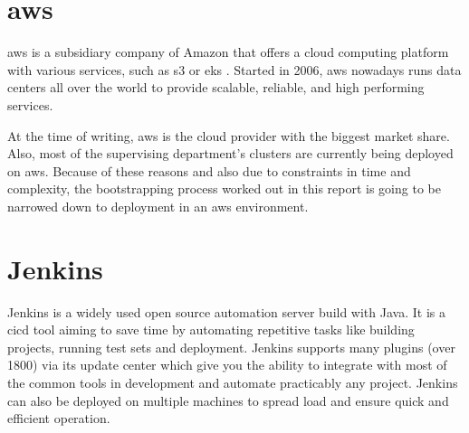 
\section{\ac{aws}}
\ac{aws} is a subsidiary company of Amazon that offers a cloud computing platform with various services, such as \ac{s3} \cite{aws.s3} or \ac{eks} \cite{aws.eks}.
Started in 2006, \ac{aws} nowadays runs data centers all over the world to provide scalable, reliable, and high performing services. \cite{aws.linkedin, whatisaws}

At the time of writing, \ac{aws} is the cloud provider with the biggest market share. \cite{aws.marketshare}
Also, most of the supervising department's clusters are currently being deployed on \ac{aws}.
Because of these reasons and also due to constraints in time and complexity, the bootstrapping process worked out in this report is going to be narrowed down to deployment in an \ac{aws} environment.

\section{Jenkins}
Jenkins is a widely used open source automation server build with Java.
It is a \ac{cicd} tool aiming to save time by automating repetitive tasks like building projects, running test sets and deployment.
Jenkins supports many plugins (over 1800) via its update center which give you the ability to integrate with most of the common tools in development and automate practicably any project.
Jenkins can also be deployed on multiple machines to spread load and ensure quick and efficient operation.
\cite{jenkins.io, jenkins.github, gitlab.cicd}

